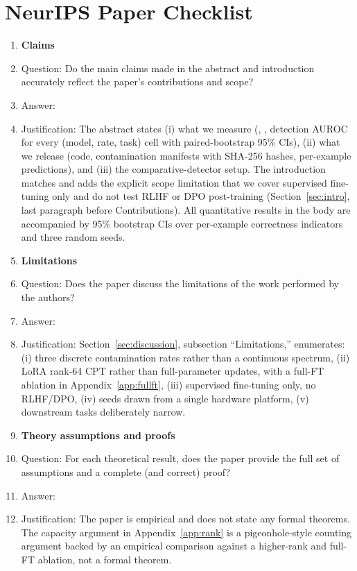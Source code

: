 \section*{NeurIPS Paper Checklist}

\begin{enumerate}

\item {\bf Claims}
    \item[] Question: Do the main claims made in the abstract and introduction accurately reflect the paper's contributions and scope?
    \item[] Answer: \answerYes{}
    \item[] Justification: The abstract states (i) what we measure (\cpr, \cts, detection AUROC for every (model, rate, task) cell with paired-bootstrap 95\% CIs), (ii) what we release (code, contamination manifests with SHA-256 hashes, per-example predictions), and (iii) the comparative-detector setup. The introduction matches and adds the explicit scope limitation that we cover supervised fine-tuning only and do not test RLHF or DPO post-training (Section~\ref{sec:intro}, last paragraph before Contributions). All quantitative results in the body are accompanied by 95\% bootstrap CIs over per-example correctness indicators and three random seeds.

\item {\bf Limitations}
    \item[] Question: Does the paper discuss the limitations of the work performed by the authors?
    \item[] Answer: \answerYes{}
    \item[] Justification: Section~\ref{sec:discussion}, subsection ``Limitations,'' enumerates: (i) three discrete contamination rates rather than a continuous spectrum, (ii) LoRA rank-64 CPT rather than full-parameter updates, with a full-FT ablation in Appendix~\ref{app:fullft}, (iii) supervised fine-tuning only, no RLHF/DPO, (iv) seeds drawn from a single hardware platform, (v) downstream tasks deliberately narrow.

\item {\bf Theory assumptions and proofs}
    \item[] Question: For each theoretical result, does the paper provide the full set of assumptions and a complete (and correct) proof?
    \item[] Answer: \answerNA{}
    \item[] Justification: The paper is empirical and does not state any formal theorems. The capacity argument in Appendix~\ref{app:rank} is a pigeonhole-style counting argument backed by an empirical comparison against a higher-rank and full-FT ablation, not a formal theorem.


\end{enumerate}
